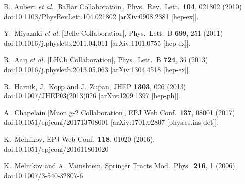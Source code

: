 \documentclass[aps,prd,groupaddress,floatfix,tighten,nofootinbib,showpacs,
amsfonts,superscriptaddress]{revtex4}
\begin{document}
{\begin{thebibliography}{99}
  B.~Aubert {\it et al.} [BaBar Collaboration],
  Phys.\ Rev.\ Lett.\  {\bf 104}, 021802 (2010)
  doi:10.1103/PhysRevLett.104.021802
  [arXiv:0908.2381 [hep-ex]].
  
  Y.~Miyazaki {\it et al.} [Belle Collaboration],
  Phys.\ Lett.\ B {\bf 699}, 251 (2011)
  doi:10.1016/j.physletb.2011.04.011
  [arXiv:1101.0755 [hep-ex]].
  
  R.~Aaij {\it et al.} [LHCb Collaboration],
  Phys.\ Lett.\ B {\bf 724}, 36 (2013)
  doi:10.1016/j.physletb.2013.05.063
  [arXiv:1304.4518 [hep-ex]].
  
  R.~Harnik, J.~Kopp and J.~Zupan,
  JHEP {\bf 1303}, 026 (2013)
  doi:10.1007/JHEP03(2013)026
  [arXiv:1209.1397 [hep-ph]].
  
  A.~Chapelain [Muon g-2 Collaboration],
  EPJ Web Conf.\  {\bf 137}, 08001 (2017)
  doi:10.1051/epjconf/201713708001
  [arXiv:1701.02807 [physics.ins-det]].
  
  K.~Melnikov,
  EPJ Web Conf.\  {\bf 118}, 01020 (2016).
  doi:10.1051/epjconf/201611801020
  
  K.~Melnikov and A.~Vainshtein,
  Springer Tracts Mod.\ Phys.\  {\bf 216}, 1 (2006).
  doi:10.1007/3-540-32807-6
  

\end{thebibliography}}
\end{document}
